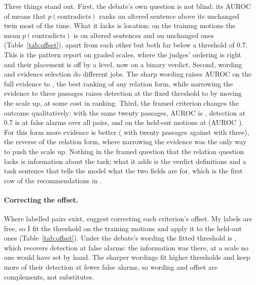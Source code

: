 \documentclass[11pt,a4paper]{article}
\newcommand{\pc}{$p(\text{contradicts})$}
\begin{document}
Three things stand out. First, the debate's own question is not blind: its AUROC of \aurocLooseTwoZero{} means that \pc{} ranks an altered sentence above its unchanged twin most of the time. What it lacks is location: on the training motions the mean \pc{} is \meanAltLooseTwoZero{} on altered sentences and \meanUnLooseTwoZero{} on unchanged ones (Table~\ref{tab:offset}), apart from each other but both far below a threshold of 0.7. This is the pattern \citet{rao2026jev} report on graded scales, where the judges' ordering is right and their placement is off by a level, now on a binary verdict. Second, wording and evidence selection do different jobs. The sharp wording raises AUROC on the full evidence to \aurocSharpTwoZero{}, the best ranking of any relation form, while narrowing the evidence to three passages raises detection at the fixed threshold to \detSharpThree{} by moving the scale up, at some cost in ranking. Third, the framed criterion changes the outcome qualitatively: with the same twenty passages, AUROC is \aurocFramedTwoZero{}, detection at 0.7 is \detFramedTwoZero{} at \faFramedTwoZero{} false alarms over all pairs, and on the held-out motions \subHeldoutmotionsFramedTwoZeroDet{} at \subHeldoutmotionsFramedTwoZeroFa{} (AUROC \subHeldoutmotionsFramedTwoZeroAuroc{}). For this form more evidence is better (\aurocFramedTwoZero{} with twenty passages against \aurocFramedThree{} with three), the reverse of the relation form, where narrowing the evidence was the only way to push the scale up. Nothing in the framed question that the relation question lacks is information about the task; what it adds is the verdict definitions and a task sentence that tells the model what the two fields are for, which is the first row of the recommendations in \citet{rao2026jev}.

\begin{table}[t]
\centering\small
{}
\caption{Offset correction. $\bar p$ is the mean \pc{} on the training motions; $\tau^\star$ the threshold that maximises Youden's $J$ (detection minus false alarm) there \citep{youden1950index}; the next columns apply it to the held-out motions, next to the same rates at the fixed 0.7.}
\label{tab:offset}
\end{table}

\paragraph{Correcting the offset.} Where labelled pairs exist, \citet{rao2026jev} suggest correcting each criterion's offset. My labels are free, so I fit the threshold on the training motions and apply it to the held-out ones (Table~\ref{tab:offset}). Under the debate's wording the fitted threshold is \tauLooseTwoZero{}, which recovers \offDetLooseTwoZero{} detection at \offFaLooseTwoZero{} false alarms: the information was there, at a scale no one would have set by hand. The sharper wordings fit higher thresholds and keep more of their detection at fewer false alarms, so wording and offset are complements, not substitutes.
\end{document}
